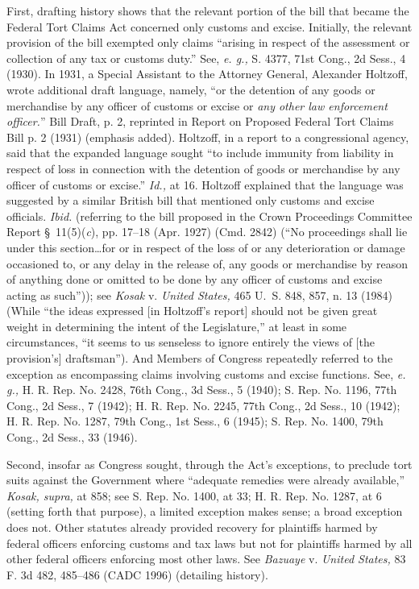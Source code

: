   First, drafting history shows that the relevant portion of the bill that became the Federal Tort Claims Act concerned only customs and excise. Initially, the relevant provision of the bill exempted only claims ``arising in respect of the assessment or collection of any tax or customs duty.'' See, \emph{e. g.,} S. 4377, 71st Cong., 2d Sess., 4 (1930). In 1931, a Special Assistant to the Attorney General, Alexander Holtzoff, wrote additional draft language, namely, ``or the detention of any goods or merchandise by any officer of customs or excise or \emph{any other law enforcement officer.}'' Bill Draft, p. 2, reprinted in Report on Proposed Federal Tort Claims Bill p. 2 (1931) (emphasis added). Holtzoff, in a report to a congressional agency, said that the expanded language sought ``to include immunity from liability in respect of loss in connection with the detention of goods or merchandise by any officer of customs or excise.'' \emph{Id.,} at 16. Holtzoff explained that the language was suggested by a similar British bill that mentioned only customs and excise officials. \emph{Ibid.} (referring to the bill proposed in the Crown Proceedings Committee Report \S~11(5)(\emph{c}), pp. 17--18 (Apr. 1927) (Cmd. 2842) (``No proceedings shall lie under this section\dots for \newpage  or in respect of the loss of or any deterioration or damage occasioned to, or any delay in the release of, any goods or merchandise by reason of anything done or omitted to be done by any officer of customs and excise acting as such'')); see \emph{Kosak} v. \emph{United States,} 465 U.~S. 848, 857, n. 13 (1984) (While ``the ideas expressed [in Holtzoff's report] should not be given great weight in determining the intent of the Legislature,'' at least in some circumstances, ``it seems to us senseless to ignore entirely the views of [the provision's] draftsman''). And Members of Congress repeatedly referred to the exception as encompassing claims involving customs and excise functions. See, \emph{e. g.,} H. R. Rep. No. 2428, 76th Cong., 3d Sess., 5 (1940); S. Rep. No. 1196, 77th Cong., 2d Sess., 7 (1942); H. R. Rep. No. 2245, 77th Cong., 2d Sess., 10 (1942); H. R. Rep. No. 1287, 79th Cong., 1st Sess., 6 (1945); S. Rep. No. 1400, 79th Cong., 2d Sess., 33 (1946).

  Second, insofar as Congress sought, through the Act's exceptions, to preclude tort suits against the Government where ``adequate remedies were already available,'' \emph{Kosak, supra,} at 858; see S. Rep. No. 1400, at 33; H. R. Rep. No. 1287, at 6 (setting forth that purpose), a limited exception makes sense; a broad exception does not. Other statutes already provided recovery for plaintiffs harmed by federal officers enforcing customs and tax laws but not for plaintiffs harmed by all other federal officers enforcing most other laws. See \emph{Bazuaye} v. \emph{United States,} 83 F. 3d 482, 485--486 (CADC 1996) (detailing history).

